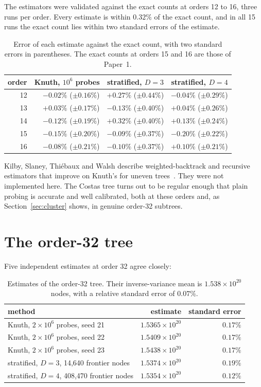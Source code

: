 The estimators were validated against the exact counts at orders 12 to 16, three runs per order.
Every estimate is within $0.32\%$ of the exact count, and in all 15 runs the exact count lies within
two standard errors of the estimate.

\begin{table}[H]
\centering
\small
\begin{tabular}{@{}rrrr@{}}
\toprule
order & Knuth, $10^6$ probes & stratified, $D=3$ & stratified, $D=4$ \\
\midrule
12 & $-0.02\%$ ($\pm0.16\%$) & $+0.27\%$ ($\pm0.44\%$) & $-0.04\%$ ($\pm0.29\%$) \\
13 & $+0.03\%$ ($\pm0.17\%$) & $-0.13\%$ ($\pm0.40\%$) & $+0.04\%$ ($\pm0.26\%$) \\
14 & $-0.12\%$ ($\pm0.19\%$) & $+0.32\%$ ($\pm0.40\%$) & $+0.13\%$ ($\pm0.24\%$) \\
15 & $-0.15\%$ ($\pm0.20\%$) & $-0.09\%$ ($\pm0.37\%$) & $-0.20\%$ ($\pm0.22\%$) \\
16 & $-0.08\%$ ($\pm0.21\%$) & $-0.10\%$ ($\pm0.37\%$) & $+0.10\%$ ($\pm0.21\%$) \\
\bottomrule
\end{tabular}
\caption{Error of each estimate against the exact count, with two standard errors in parentheses. The
exact counts at orders 15 and 16 are those of Paper~1.}
\label{tab:validation}
\end{table}

Kilby, Slaney, Thi\'ebaux and Walsh describe weighted-backtrack and recursive estimators that improve
on Knuth's for uneven trees~\cite{kilby2006}. They were not implemented here. The Costas tree turns out
to be regular enough that plain probing is accurate and well calibrated, both at these orders and,
as Section~\ref{sec:cluster} shows, in genuine order-32 subtrees.

\section{The order-32 tree}
\label{sec:order32}
Five independent estimates at order 32 agree closely:

\begin{table}[H]
\centering
\small
\begin{tabular}{@{}lrr@{}}
\toprule
method & estimate & standard error \\
\midrule
Knuth, $2\times10^6$ probes, seed 21 & $1.5365\times10^{20}$ & $0.17\%$ \\
Knuth, $2\times10^6$ probes, seed 22 & $1.5409\times10^{20}$ & $0.17\%$ \\
Knuth, $2\times10^6$ probes, seed 23 & $1.5438\times10^{20}$ & $0.17\%$ \\
stratified, $D=3$, 14{,}640 frontier nodes & $1.5374\times10^{20}$ & $0.19\%$ \\
stratified, $D=4$, 408{,}470 frontier nodes & $1.5354\times10^{20}$ & $0.12\%$ \\
\bottomrule
\end{tabular}
\caption{Estimates of the order-32 tree. Their inverse-variance mean is $1.538\times10^{20}$ nodes, with a
relative standard error of $0.07\%$.}
\label{tab:order32}
\end{table}

